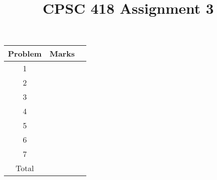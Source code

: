 \documentclass{assignment}
\title{CPSC 418 Assignment 3}
\begin{document}
\begin{center}
\renewcommand{\arraystretch}{2}
\begin{tabular}{|c|c|c|} \hline
Problem & Marks \\ \hline \hline
1 & \\ \hline
2 & \\ \hline
3 & \\ \hline
4 & \\ \hline
5 & \\ \hline
6 & \\ \hline
7 & \\ \hline \hline
Total & \\ \hline
\end{tabular}
\end{center}

\bigskip

\clearpage
\end{document}
